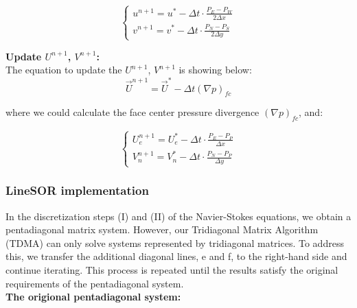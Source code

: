 \documentclass[12pt]{article}
\begin{document}
$$
\begin{cases}
    u^{n+1} = u^* - \Delta t \cdot \frac{P_E - P_W}{2\Delta x} \\
    v^{n+1} = v^* - \Delta t \cdot \frac{P_N - P_S}{2\Delta y}
\end{cases}
$$


\noindent \textbf{Update $U^{n+1}$, $V^{n+1}$:}\\
The equation to update the $U^{n+1}$, $V^{n+1}$ is showing below:
$$
\vec{U}^{n+1} = \vec{U}^* - \Delta t (\nabla p)_{fc}
$$

where we could calculate the face center pressure divergence $(\nabla p)_{fc}$, and:


$$
\begin{cases}
    U_{e}^{n+1} = U_{e}^* - \Delta t \cdot \frac{P_E - P_P}{\Delta x} \\
    V_{n}^{n+1} = V_{n}^* - \Delta t \cdot \frac{P_N - P_P}{\Delta y}
    \end{cases}
$$

\subsubsection{LineSOR implementation}
In the discretization steps (I) and (II) of the Navier-Stokes equations, we obtain a pentadiagonal matrix system. However, our Tridiagonal Matrix Algorithm (TDMA) can only solve systems represented by tridiagonal matrices. To address this, we transfer the additional diagonal lines, e and f, to the right-hand side and continue iterating. This process is repeated until the results satisfy the original requirements of the pentadiagonal system.\\



\noindent \textbf{The origional pentadiagonal system:}
\end{document}

